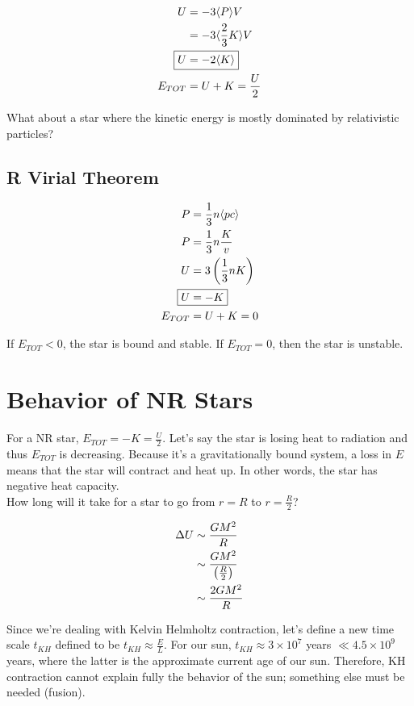 \begin{align}
U &= -3\langle P\rangle V\\
&= -3 \langle \frac{2}{3}K \rangle V\\
\Aboxed{U &= -2\langle K\rangle }\\
E_{TOT} &= U + K = \frac{U}{2}
\end{align}

What about a star where the kinetic energy is mostly dominated by relativistic particles?
\subsection{R Virial Theorem}

\begin{align}
P &= \frac{1}{3}n\langle pc\rangle \\
P &= \frac{1}{3}n\frac{K}{v}\\
U &= 3 \lp \frac{1}{3}nK \rp\\
\Aboxed{U &= -K}\\
E_{TOT} &= U + K = 0
\end{align}

If $E_{TOT} < 0$, the star is bound and stable. If $E_{TOT} = 0$, then the star is unstable. 

\section{Behavior of NR Stars}

For a NR star, $E_{TOT} = -K = \frac{U}{2}$. Let's say the star is losing heat to radiation and thus $E_{TOT}$ is decreasing. Because it's a gravitationally bound system, a loss in $E$ means that the star will contract and heat up. In other words, the star has negative heat capacity. \\

How long will it take for a star to go from $r=R$ to $r=\frac{R}{2}$? 

\begin{align}
\Delta U &\sim \frac{GM^2}{R}\\
&\sim \frac{GM^2}{ \left(\frac{R}{2} \right)}\\
&\sim \frac{2GM^2}{R}
\end{align}

Since we're dealing with Kelvin Helmholtz contraction, let's define a new time scale $t_{KH}$ defined to be $t_{KH} \approx \frac{E}{L}$. For our sun, $t_{KH} \approx 3 \times 10^7$ years $\ll 4.5 \times 10^9$ years, where the latter is the approximate current age of our sun. Therefore, KH contraction cannot explain fully the behavior of the sun; something else must be needed (fusion). 